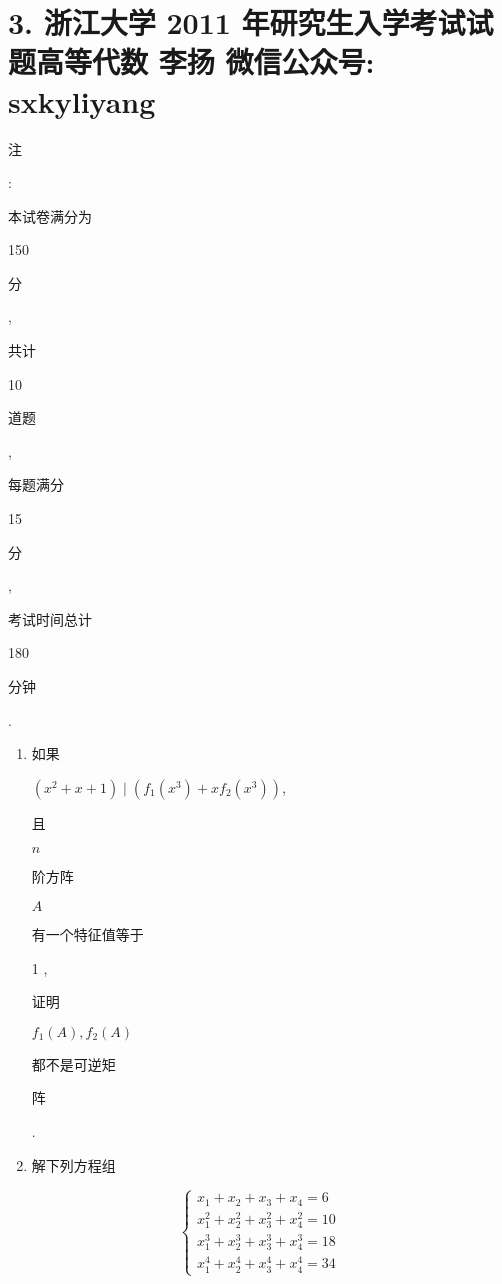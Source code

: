\documentclass[10pt]{article}
\begin{document}
\section{3. 浙江大学 2011 年研究生入学考试试题高等代数 
 李扬 
 微信公众号: sxkyliyang}
\begin{CJK}{UTF8}{mj}注\end{CJK}: \begin{CJK}{UTF8}{mj}本试卷满分为\end{CJK} 150 \begin{CJK}{UTF8}{mj}分\end{CJK}, \begin{CJK}{UTF8}{mj}共计\end{CJK} 10 \begin{CJK}{UTF8}{mj}道题\end{CJK}, \begin{CJK}{UTF8}{mj}每题满分\end{CJK} 15 \begin{CJK}{UTF8}{mj}分\end{CJK}, \begin{CJK}{UTF8}{mj}考试时间总计\end{CJK} 180 \begin{CJK}{UTF8}{mj}分钟\end{CJK}.

\begin{enumerate}
  \item \begin{CJK}{UTF8}{mj}如果\end{CJK} $\left(x^{2}+x+1\right) \mid\left(f_{1}\left(x^{3}\right)+x f_{2}\left(x^{3}\right)\right)$, \begin{CJK}{UTF8}{mj}且\end{CJK} $n$ \begin{CJK}{UTF8}{mj}阶方阵\end{CJK} $A$ \begin{CJK}{UTF8}{mj}有一个特征值等于\end{CJK} 1 , \begin{CJK}{UTF8}{mj}证明\end{CJK} $f_{1}(A), f_{2}(A)$ \begin{CJK}{UTF8}{mj}都不是可逆矩\end{CJK} \begin{CJK}{UTF8}{mj}阵\end{CJK}.

  \item \begin{CJK}{UTF8}{mj}解下列方程组\end{CJK}

\end{enumerate}
$$
\left\{\begin{array}{l}
x_{1}+x_{2}+x_{3}+x_{4}=6 \\
x_{1}^{2}+x_{2}^{2}+x_{3}^{2}+x_{4}^{2}=10 \\
x_{1}^{3}+x_{2}^{3}+x_{3}^{3}+x_{4}^{3}=18 \\
x_{1}^{4}+x_{2}^{4}+x_{3}^{4}+x_{4}^{4}=34
\end{array}\right.
$$
\end{document}
